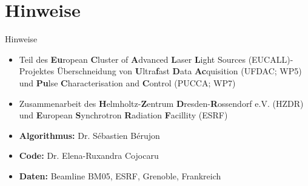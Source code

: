 \section{Hinweise}

\begin{frame}{Hinweise}
	\begin{itemize}
		\item<2-> Teil des \textbf{Eu}ropean \textbf{C}luster of \textbf{A}dvanced \textbf{L}aser \textbf{L}ight Sources (EUCALL)-Projektes
		\rightarrow Überschneidung von \textbf{U}ltra\textbf{f}ast \textbf{D}ata \textbf{Ac}quisition (UFDAC; WP5) und \textbf{Pu}lse \textbf{C}haracterisation and \textbf{C}ontrol (PUCCA; WP7)
		\item<3-> Zusammenarbeit des \textbf{H}elmholtz-\textbf{Z}entrum \textbf{D}resden-\textbf{R}ossendorf e.V. (HZDR) und \textbf{E}uropean \textbf{S}ynchrotron \textbf{R}adiation \textbf{F}acillity (ESRF)
		\item<4-> \textbf{Algorithmus:} Dr. Sébastien Bérujon
		\item<5-> \textbf{Code:} Dr. Elena-Ruxandra Cojocaru
		\item<6-> \textbf{Daten:} Beamline BM05, ESRF, Grenoble, Frankreich
	\end{itemize}
\end{frame}